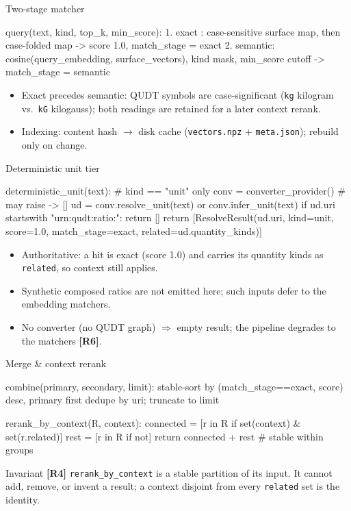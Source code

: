 \documentclass[aspectratio=169]{beamer}
\newcommand{\code}[1]{\texttt{\small #1}}
\newcommand{\req}[1]{\textbf{[#1]}}
\begin{document}
\begin{frame}[fragile]{Two-stage matcher}
  \begin{semiverbatim}\scriptsize
query(text, kind, top_k, min_score):
  1. exact   : case-sensitive surface map, then case-folded map
               -> score 1.0, match_stage = exact
  2. semantic: cosine(query_embedding, surface_vectors), kind mask,
               min_score cutoff -> match_stage = semantic
  \end{semiverbatim}
  \begin{itemize}
    \item Exact precedes semantic: QUDT symbols are case-significant
          (\code{kg} kilogram vs.\ \code{kG} kilogauss); both readings are
          retained for a later context rerank.
    \item Indexing: content hash $\rightarrow$ disk cache
          (\code{vectors.npz} $+$ \code{meta.json}); rebuild only on change.
  \end{itemize}
\end{frame}

\begin{frame}[fragile]{Deterministic unit tier}
  \begin{semiverbatim}\scriptsize
deterministic_unit(text):                 # kind == "unit" only
  conv = converter_provider()             # may raise -> []
  ud = conv.resolve_unit(text)  or  conv.infer_unit(text)
  if ud.uri startswith "urn:qudt:ratio:": return []
  return [ResolveResult(ud.uri, kind=unit, score=1.0,
          match_stage=exact, related=ud.quantity_kinds)]
  \end{semiverbatim}
  \begin{itemize}
    \item Authoritative: a hit is exact (score 1.0) and carries its
          quantity kinds as \code{related}, so context still applies.
    \item Synthetic composed ratios are not emitted here; such inputs
          defer to the embedding matchers.
    \item No converter (no QUDT graph) $\Rightarrow$ empty result; the
          pipeline degrades to the matchers \req{R6}.
  \end{itemize}
\end{frame}

\begin{frame}[fragile]{Merge \& context rerank}
  \begin{semiverbatim}\scriptsize
combine(primary, secondary, limit):
  stable-sort by (match_stage==exact, score) desc, primary first
  dedupe by uri; truncate to limit

rerank_by_context(R, context):
  connected = [r in R if set(context) & set(r.related)]
  rest      = [r in R if not]
  return connected + rest                 # stable within groups
  \end{semiverbatim}
  \begin{block}{Invariant \req{R4}}
    \code{rerank\_by\_context} is a stable partition of its input. It
    cannot add, remove, or invent a result; a context disjoint from every
    \code{related} set is the identity.
  \end{block}
\end{frame}
\end{document}

